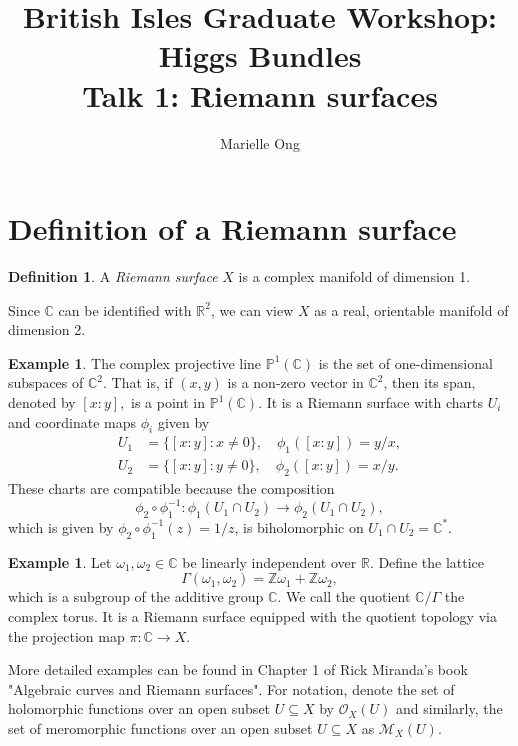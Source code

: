 \documentclass[10pt, a4paper]{article}
\title{British Isles Graduate Workshop: Higgs Bundles \\
Talk 1: Riemann surfaces}
\author{Marielle Ong}
\theoremstyle{plain}
\theoremstyle{definition}
\newtheorem{defn}[thrm]{Definition}
\newtheorem{exmp}[thrm]{Example}
\begin{document}
\maketitle
\section{Definition of a Riemann surface}
\begin{defn} A \emph{Riemann surface} $X$ is a complex manifold of dimension 1. 
\end{defn} 
Since $\mathbb{C}$ can be identified with $\mathbb{R}^2$, we can view $X$ as a real, orientable manifold of dimension 2.  
\begin{exmp} The complex projective line $\mathbb{P}^1(\mathbb{C})$ 
is the set of one-dimensional subspaces of $\mathbb{C}^2$. That is, if $(x, y)$ is a non-zero vector in $\mathbb{C}^2$, then its span, denoted by $[x : y],$ is a point in $\mathbb{P}^1(\mathbb{C}).$ It is a Riemann surface with charts $U_i$ and coordinate maps $\phi_i$ given by 
\begin{align*} 
U_1 &= \{[x: y] : x \neq 0 \},  \quad \phi_1([x: y]) = y/x, \\
U_2 &= \{[x: y] : y \neq 0 \},  \quad \phi_2([x: y]) = x/y. 
\end{align*}
These charts are compatible because the composition
$$\phi_2 \circ \phi_1^{-1}: \phi_1(U_1 \cap U_2) \rightarrow \phi_2(U_1 \cap U_2),$$
which is given by $\phi_2 \circ \phi_1^{-1}(z) = 1/z$, is biholomorphic on $U_1 \cap U_2 = \mathbb{C}^*$. 
\end{exmp}
\begin{exmp} Let $\omega_1, \omega_2 \in \mathbb{C}$ be linearly independent over $\mathbb{R}$. Define the lattice 
$$\Gamma(\omega_1, \omega_2) = \mathbb{Z}\omega_1  + \mathbb{Z}\omega_2,$$
which is a subgroup of the additive group $\mathbb{C}$. We call the quotient $\mathbb{C}/\Gamma$ the complex torus. It is a Riemann surface equipped with the quotient topology via the projection map $\pi: \mathbb{C} \rightarrow X$.
\end{exmp} 
More detailed examples can be found in Chapter 1 of Rick Miranda's book "Algebraic curves and Riemann surfaces". For notation, denote the set of holomorphic functions over an open subset $U \subseteq X$ by $\mathcal{O}_X(U)$ and similarly, the set of meromorphic functions over an open subset $U \subseteq X$ as $\mathcal{M}_X(U)$. 
\end{document}
